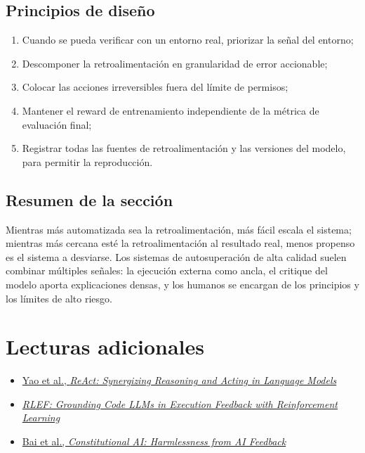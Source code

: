\documentclass[a4paper]{article}
\begin{document}
\subsection{Principios de diseño}

\begin{enumerate}
    \item Cuando se pueda verificar con un entorno real, priorizar la señal del entorno;
    \item Descomponer la retroalimentación en granularidad de error accionable;
    \item Colocar las acciones irreversibles fuera del límite de permisos;
    \item Mantener el reward de entrenamiento independiente de la métrica de evaluación final;
    \item Registrar todas las fuentes de retroalimentación y las versiones del modelo, para permitir la reproducción.
\end{enumerate}

\subsection{Resumen de la sección}

Mientras más automatizada sea la retroalimentación, más fácil escala el sistema; mientras más cercana esté la retroalimentación al resultado real, menos propenso es el sistema a desviarse. Los sistemas de autosuperación de alta calidad suelen combinar múltiples señales: la ejecución externa como ancla, el critique del modelo aporta explicaciones densas, y los humanos se encargan de los principios y los límites de alto riesgo.

\section{Lecturas adicionales}

\begin{itemize}
    \item \href{https://arxiv.org/abs/2210.03629}{Yao et al., \emph{ReAct: Synergizing Reasoning and Acting in Language Models}}
    \item \href{https://arxiv.org/abs/2410.02089}{\emph{RLEF: Grounding Code LLMs in Execution Feedback with Reinforcement Learning}}
    \item \href{https://arxiv.org/abs/2212.08073}{Bai et al., \emph{Constitutional AI: Harmlessness from AI Feedback}}
\end{itemize}
\end{document}

